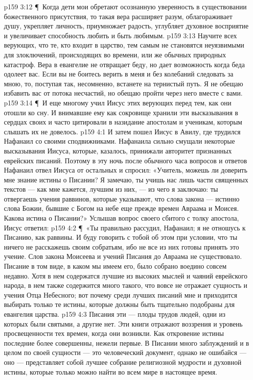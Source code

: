 \vs p159 3:12 \P\ Когда дети мои обретают осознанную уверенность в существовании божественного присутствия, то такая вера расширяет разум, облагораживает душу, укрепляет личность, приумножает радость, углубляет духовное восприятие и увеличивает способность любить и быть любимым.
\vs p159 3:13 Научите всех верующих, что те, кто входит в царство, тем самым не становятся неуязвимыми для злоключений, происходящих во времени, или же обычных природных катастроф. Вера в евангелие не отвращает беду, но дает возможность  когда беда одолеет вас. Если вы не боитесь верить в меня и без колебаний следовать за мною, то, поступая так, несомненно, встанете на тернистый путь. Я не обещаю избавить вас от потока несчастий, но обещаю пройти через него вместе с вами.
\vs p159 3:14 \P\ И еще многому учил Иисус этих верующих перед тем, как они отошли ко сну. И внимавшие ему как сокровище хранили эти высказывания в сердцах своих и часто цитировали в назидание апостолам и ученикам, которым слышать их не довелось.
\vs p159 4:1 И затем пошел Иисус в Авилу, где трудился Нафанаил со своими сподвижниками. Нафанаила сильно смущали некоторые высказывания Иисуса, которые, казалось, принижали авторитет признанных еврейских писаний. Поэтому в эту ночь после обычного часа вопросов и ответов Нафанаил отвел Иисуса от остальных и спросил: «Учитель, можешь ли доверить мне знание истины о Писании? Я замечаю, ты учишь нас лишь части священных текстов --- как мне кажется, лучшим из них, --- из чего я заключаю: ты отвергаешь учения раввинов, которые указывают, что слова закона --- истинно слова Божии, бывшие с Богом на небе еще прежде времен Авраама и Моисея. Какова истина о Писании?» Услышав вопрос своего сбитого с толку апостола, Иисус ответил:
\vs p159 4:2 \P\ «Ты правильно рассудил, Нафанаил; я не отношусь к Писанию, как раввины. И буду говорить с тобой об этом при условии, что ты ничего не расскажешь своим собратьям, ибо не все из них готовы принять это учение. Слов закона Моисеева и учений Писания до Авраама не существовало. Писание в том виде, в каком мы имеем его, было собрано воедино совсем недавно. Хотя в нем содержатся лучшие из высоких мыслей и чаяний еврейского народа, в нем также содержится много такого, что вовсе не отражает сущность и учения Отца Небесного; вот почему среди лучших писаний мне и приходится выбирать только те истины, которые должны быть тщательно подобраны для евангелия царства.
\vs p159 4:3 Писания эти --- плоды трудов людей, одни из которых были святыми, а другие нет. Эти книги отражают воззрения и уровень просвещенности тех времен, когда они возникли. Как откровение истины последние более совершенны, нежели первые. В Писании много заблуждений и в целом по своей сущности --- это человеческий документ, однако не ошибайся --- оно --- представляет собой лучшее собрание религиозной мудрости и духовной истины, которые только можно найти во всем мире в настоящее время.
